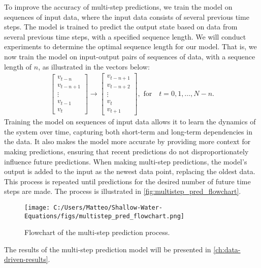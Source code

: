To improve the accuracy of multi-step predictions, we train the model on sequences of input data, where the input data consists of several previous time steps.
The model is trained to predict the output state based on data from several previous time steps, with a specified sequence length.
We will conduct experiments to determine the optimal sequence length for our model.
That is, we now train the model on input-output pairs of sequences of data, with a sequence length of $n$, as illustrated in the vectors below:
\begin{align*}
    \begin{bmatrix}
        v_{t-n} \\ v_{t-n+1} \\ \vdots \\ v_{t-1} \\ v_t
    \end{bmatrix}
    \to
    \begin{bmatrix}
        v_{t-n+1} \\ v_{t-n+2} \\ \vdots \\ v_{t} \\ v_{t+1}
    \end{bmatrix},
    \text{ for} \quad t = 0, 1, \ldots, N-n.
\end{align*}
Training the model on sequences of input data allows it to learn the dynamics of the system over time, capturing both short-term and long-term dependencies in the data.
It also makes the model more accurate by providing more context for making predictions, ensuring that recent predictions do not disproportionately influence future predictions.
When making multi-step predictions, the model's output is added to the input as the newest data point, replacing the oldest data.
This process is repeated until predictions for the desired number of future time steps are made.
The process is illustrated in \autoref{fig:multistep_pred_flowchart}.
\begin{figure}[H]
    \centering
    \texttt{[image: C:/Users/Matteo/Shallow-Water-Equations/figs/multistep\_pred\_flowchart.png]}
    \caption{Flowchart of the multi-step prediction process.}\label{fig:multistep_pred_flowchart}
\end{figure}
The results of the multi-step prediction model will be presented in \autoref{ch:data-driven-results}.




